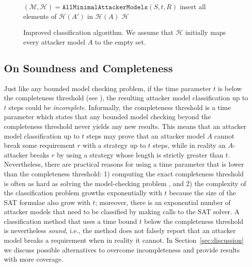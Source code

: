 \begin{figure}[!t]
\centering
{
\begin{algorithm}[H]

$(\mathcal{M},\mathcal{H})=\mathtt{AllMinimalAttackerModels}(S,t,R)$\;
{
	{
		{
			insert all elements of $\mathcal{H}(A')$ in $\mathcal{H}(A)$\;
		}
	 }
}
 \Return $\mathcal{H}$\;
 \caption{Improved classification algorithm. We assume that $\mathcal{H}$ initially maps every attacker model $A$ to the empty set.}
 \label{alg:GoodQuantification}
\end{algorithm}
}
\vspace{-0.5cm}
\end{figure}

\subsection{On Soundness and Completeness}
\label{sec:completeness}
Just like any bounded model checking problem, if the time parameter $t$ is below the {completeness threshold} (see \cite{EfficientComputationOfRecurrenceDiameters}), the resulting attacker model classification up to $t$ steps could be \emph{incomplete}. Informally, the completeness threshold is a time parameter which states that any bounded model checking beyond the completeness threshold never yields any new results. 
This means that an attacker model classification up to $t$ steps may prove that an attacker model $A$ cannot break some requirement $r$ with a strategy up to $t$ steps, while in reality an $A$-attacker breaks $r$ by using a strategy whose length is strictly greater than $t$. Nevertheless, there are practical reasons for using a time parameter that is lower than the completeness threshold: 1) computing the exact completeness threshold is often as hard as solving the model-checking problem \cite{HandbookOfModelChecking}, and 2) the complexity of the classification problem growths exponentially with $t$ because the size of the SAT formulae also grow with $t$; moreover, there is an exponential number of attacker models that need to be classified by making calls to the SAT solver. A classification method that uses a time bound $t$ below the completeness threshold is nevertheless \emph{sound}, i.e., the method does not falsely report that an attacker model breaks a requirement when in reality it cannot. In Section~\ref{sec:discussion} we discuss possible alternatives to overcome incompleteness and provide results with more coverage.  

